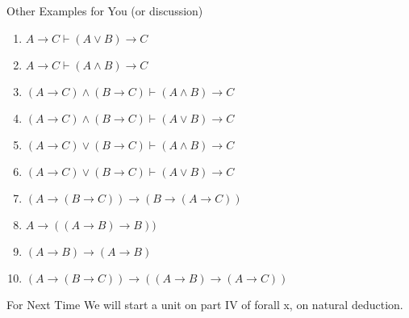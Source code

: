 \documentclass[
  ignorenonframetext,
]{beamer}
\providecommand{\tightlist}{%
  \setlength{\itemsep}{0pt}\setlength{\parskip}{0pt}}
\renewcommand{\,}{\text{, }}
\begin{document}
\begin{frame}{Other Examples for You (or discussion)}
\protect\hypertarget{other-examples-for-you-or-discussion}{}
\begin{enumerate}
\tightlist
\item
  \(A \rightarrow C \vdash (A \vee B) \rightarrow C\)
\item
  \(A \rightarrow C \vdash (A \wedge B) \rightarrow C\)
\item
  \((A \rightarrow C) \wedge (B \rightarrow C) \vdash (A \wedge B) \rightarrow C\)
\item
  \((A \rightarrow C) \wedge (B \rightarrow C) \vdash (A \vee B) \rightarrow C\)
\item
  \((A \rightarrow C) \vee (B \rightarrow C) \vdash (A \wedge B) \rightarrow C\)
\item
  \((A \rightarrow C) \vee (B \rightarrow C) \vdash (A \vee B) \rightarrow C\)
\item
  \((A \rightarrow (B \rightarrow C)) \rightarrow (B \rightarrow (A \rightarrow C))\)
\item
  \(A \rightarrow ((A \rightarrow B) \rightarrow B))\)
\item
  \((A \rightarrow B) \rightarrow (A \rightarrow B)\)
\item
  \((A \rightarrow (B \rightarrow C)) \rightarrow ((A \rightarrow B) \rightarrow (A \rightarrow C))\)
\end{enumerate}
\end{frame}

\begin{frame}{For Next Time}
\protect\hypertarget{for-next-time}{}
We will start a unit on part IV of forall x, on natural deduction.
\end{frame}
\end{document}
